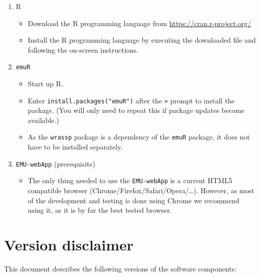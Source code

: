 \documentclass[]{book}
\providecommand{\tightlist}{%
  \setlength{\itemsep}{0pt}\setlength{\parskip}{0pt}}
\begin{document}
\begin{enumerate}
\def\labelenumi{\arabic{enumi}.}
\tightlist
\item
  R

  \begin{itemize}
  \tightlist
  \item
    Download the R programming language from \url{https://cran.r-project.org/}
  \item
    Install the R programming language by executing the downloaded file and following the on-screen instructions.
  \end{itemize}
\item
  \texttt{emuR}

  \begin{itemize}
  \tightlist
  \item
    Start up R.
  \item
    Enter \texttt{install.packages("emuR")} after the \texttt{\textgreater{}} prompt to install the package. (You will only need to repeat this if package updates become available.)
  \item
    As the \texttt{wrassp} package is a dependency of the \texttt{emuR} package, it does not have to be installed separately.
  \end{itemize}
\item
  \texttt{EMU-webApp} (prerequisite)

  \begin{itemize}
  \tightlist
  \item
    The only thing needed to use the \texttt{EMU-webApp} is a current HTML5 compatible browser (Chrome/Firefox/Safari/Opera/\ldots{}). However, as most of the development and testing is done using Chrome we recommend using it, as it is by far the best tested browser.
  \end{itemize}
\end{enumerate}

\hypertarget{version-disclaimer}{%
\section{Version disclaimer}\label{version-disclaimer}}

This document describes the following versions of the software components:
\end{document}
